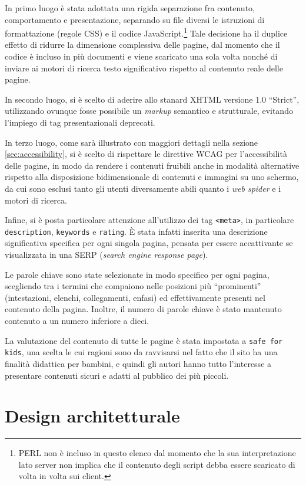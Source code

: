 \documentclass[10pt,a4paper,onecolumn]{article}
\newcommand{\inglese}[1]{\foreignlanguage{english}{\itshape{}#1}}
\begin{document}
In primo luogo è stata adottata una rigida separazione fra contenuto, comportamento e presentazione, separando su file diversi le istruzioni di formattazione (regole CSS) e il codice JavaScript.\footnote{%
  PERL non è incluso in questo elenco dal momento che la sua interpretazione lato server non implica che il contenuto degli script debba essere scaricato di volta in volta sui client.
} Tale decisione ha il duplice effetto di ridurre la dimensione complessiva delle pagine, dal momento che il codice è incluso in più documenti e viene scaricato una sola volta nonché di inviare ai motori di ricerca testo significativo rispetto al contenuto reale delle pagine.

In secondo luogo, si è scelto di aderire allo stanard XHTML versione 1.0 ``Strict'', utilizzando ovunque fosse possibile un \inglese{markup} semantico e strutturale, evitando l'impiego di tag presentazionali deprecati.


In terzo luogo, come sarà illustrato con maggiori dettagli nella sezione \ref{sec:accessibility}, si è scelto di rispettare le direttive WCAG per l'accessibilità delle pagine, in modo da rendere i contenuti fruibili anche in modalità alternative rispetto alla disposizione bidimensionale di contenuti e immagini su uno schermo, da cui sono esclusi tanto gli utenti diversamente abili quanto i \inglese{web spider} e i motori di ricerca.

Infine, si è posta particolare attenzione all'utilizzo dei tag \texttt{<meta>}, in particolare \texttt{description}, \texttt{keywords} e \texttt{rating}. È stata infatti inserita una descrizione significativa specifica per ogni singola pagina, pensata per essere accattivante se visualizzata in una SERP (\inglese{search engine response page}).

Le parole chiave sono state selezionate in modo specifico per ogni pagina, scegliendo tra i termini che compaiono nelle posizioni più ``prominenti'' (intestazioni, elenchi, collegamenti, enfasi) ed effettivamente presenti nel contenuto della pagina. Inoltre, il numero di parole chiave è stato mantenuto contenuto a un numero inferiore a dieci.

La valutazione del contenuto di tutte le pagine è stata impostata a \texttt{safe for kids}, una scelta le cui ragioni sono da ravvisarsi nel fatto che il sito ha una finalità didattica per bambini, e quindi gli autori hanno tutto l'interesse a presentare contenuti sicuri e adatti al pubblico dei più piccoli.

\section{Design architetturale}
\end{document}
